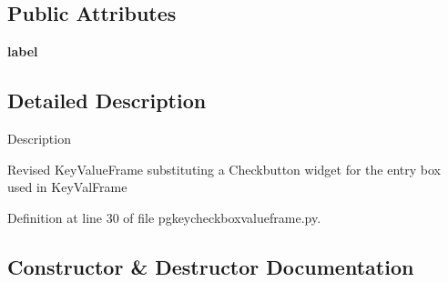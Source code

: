 \subsection*{Public Attributes}
\begin{DoxyCompactItemize}
\item 
{\bfseries label}\hypertarget{classnegui_1_1pgkeycheckboxvalueframe_1_1KeyCheckboxValueFrame_a172178389b7c214455b25fd51ae68a78}{}\label{classnegui_1_1pgkeycheckboxvalueframe_1_1KeyCheckboxValueFrame_a172178389b7c214455b25fd51ae68a78}

\end{DoxyCompactItemize}


\subsection{Detailed Description}
\begin{DoxyVerb}Description

Revised KeyValueFrame
substituting a Checkbutton widget
for the entry box used in KeyValFrame\end{DoxyVerb}
 

Definition at line 30 of file pgkeycheckboxvalueframe.\+py.



\subsection{Constructor \& Destructor Documentation}
